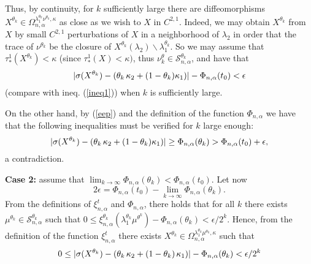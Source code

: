 \documentclass{article}
\begin{document}
Thus, by continuity, 
for $k$ sufficiently large there are diffeomorphisms 
$X^{\theta_k}\in \Omega^{\lambda_1^{\theta_k}\nu^{\theta_k},\kappa}_{n,\alpha}$ as close as we wish to
$X$ in $C^{2,1}$. Indeed, we may obtain $X^{\theta_k}$ from $X$ by small $C^{2,1}$ perturbations of $X$ in a neighborhood of $\lambda_2$  in order that the trace of $\nu^{\theta_k}$ be the closure of $X^{\theta_k}(\lambda_2)\backslash \lambda_1^{\theta_k}$.  So we may assume that $\tau_*^1(X^{\theta_k})<\kappa$ \hspace{.02in} (since $\tau_*^1(X)<\kappa)$, thus $\nu^\theta_k\in \mathcal S_{n,\alpha}^{\theta_k}$, and have that
\begin{equation}\nonumber
|\sigma(X^{\theta_k})-
(\theta_k\hspace{.02in}\kappa_2+(1-\theta_k)\kappa_1)|-\Phi_{n,\alpha}(t_0)
<\epsilon
\end{equation}
(compare with  ineq. (\ref{ineq1})) when $k$ is sufficiently large.

On the other hand, by (\ref{eep}) and the definition of the function $\Phi_{n,\alpha}$ we have that   the following inequalities must be verified for $k$ large enough:
\begin{equation}\nonumber
|\sigma(X^{\theta_k})-
(\theta_k\hspace{.02in}\kappa_2+(1-\theta_k)\kappa_1)|\geq \Phi_{n,\alpha}(\theta_k)>\Phi_{n,\alpha}(t_0)+\epsilon,
\end{equation}
a contradiction.\bigskip



\noindent
{\bf Case 2:} assume that $\lim_{k\to\infty}\Phi_{n,\alpha}(\theta_k)<\Phi_{n,\alpha}(t_0).$ Let now
\begin{equation}\label{eep1} 
2\epsilon=\Phi_{n,\alpha}(t_0)-\lim_{k\to \infty}\Phi_{n,\alpha}(\theta_k).
\end{equation}
From the definitions of $\xi^t_{n,\alpha}$ and $\Phi_{n,\alpha}$, there holds that for all $k$ there exists $\mu^{\theta_k}\in \mathcal{S}_{n,\alpha}^{\theta_k}$ such that
$0\leq\xi^{\theta_k}_{n,\alpha}(\lambda_1^{\theta_k}\mu^{\theta^k})-\Phi_{n,\alpha}(\theta_k)<
\epsilon/2^{k}$. Hence, from the definition of the function $\xi^t_{n,\alpha}$ there exists
$X^{\theta_k}\in \Omega^{\lambda_1^{\theta_k}\mu^{\theta_k},\kappa}_{n,\alpha}$ 
 such that  
\begin{equation}\nonumber
0\leq |\sigma(X^{\theta_k})-(\theta_k\hspace{.02in}\kappa_2+(1-\theta_k)\hspace{.02in}\kappa_1)|-\Phi_{n,\alpha}(\theta_k)
<\epsilon/2^k
\end{equation} 
\end{document}
